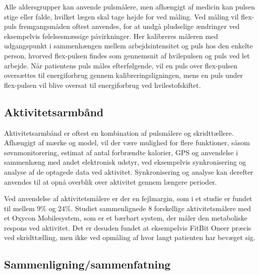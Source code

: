 Alle aldersgrupper kan anvende pulsmålere, men afhængigt af medicin kan pulsen stige eller falde, hvilket lægen skal tage højde for ved måling. Ved måling vil flex-puls fremgangsmåden oftest anvendes, for at undgå pludselige ændringer ved eksempelvis følelsesmæssige påvirkninger. Her kalibreres måleren med udgangspunkt i sammenhængen mellem arbejdsintensitet og puls hos den enkelte person, hvorved flex-pulsen findes som gennemsnit af hvilepulsen og puls ved let arbejde. Når patientens puls måles efterfølgende, vil en puls over flex-pulsen oversættes til energiforbrug gennem kalibreringsligningen, mens en puls under flex-pulsen vil blive oversat til energiforbrug ved hvilestofskiftet\citep{motionsraad2007}.


\subsection{Aktivitetsarmbånd}

Aktivitetsarmbånd er oftest en kombination af pulsmålere og skridttællere. Afhængigt af mærke og model, vil der være mulighed for flere funktioner, såsom søvnmonitorering, estimat af antal forbrændte kalorier, GPS og anvendelse i sammenhæng med andet elektronisk udstyr, ved eksempelvis synkronisering og analyse af de optagede data ved aktivitet. Synkronisering og analyse kan derefter anvendes til at opnå overblik over aktivitet gennem længere perioder\citep{pedersen2011, rudner2016, chiauzzi2014}.

Ved anvendelse af aktivitetsmålere er der en fejlmargin, som i et studie er fundet til mellem $9\%$ og $24\%$. Studiet sammenlignede $8$ forskellige aktivitetsmålere med et Oxycon Mobile\textregistered system, som er et bærbart system, der måler den metaboliske respons ved aktivitet. Det er desuden fundet at eksempelvis FitBit One\textregistered er præcis ved skridttælling, men ikke ved opmåling af hvor langt patienten har bevæget sig\citep{chiauzzi2014}.

\subsection{Sammenligning/sammenfatning}

